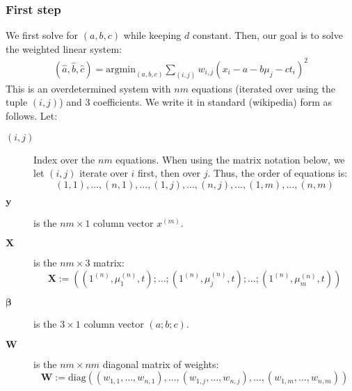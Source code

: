 \documentclass{article}
\begin{document}
\subsubsection{First step}

We first solve for $(a,b,c)$ while keeping $d$ constant. Then, our goal is to solve the weighted linear system:
\begin{align*}
(\hat{a}, \hat{b}, \hat{c}) = \mathrm{argmin}_{(a,b,c)} \sum_{(i,j)} w_{i,j} \left( x_i - a - b \mu_j - c t_i \right)^2
\end{align*}
This is an overdetermined system with $nm$ equations (iterated over using the tuple $(i,j)$) and 3 coefficients. We write it in standard (wikipedia) form as follows. Let:
\begin{description}
\item[$(i,j)$] Index over the $nm$ equations. When using the matrix notation below, we let $(i,j)$ iterate over $i$ first, then over $j$. Thus, the order of equations is:
\[
(1,1), \dots, (n,1), \dots, (1,j), \dots, (n,j), \dots, (1,m), \dots, (n,m)
\]

\item[$\bm{y}$] is the $nm \times 1$ column vector $x^{(m)}$.

\item[$\bm{X}$] is the $nm \times 3$ matrix:
\[
\bm{X} := \left( (1^{(n)}, \mu_1^{(n)}, t); \dots ; (1^{(n)}, \mu_j^{(n)}, t) ; \dots ; (1^{(n)}, \mu_m^{(n)}, t) \right)
\]

\item[$\bm{\beta}$] is the $3 \times 1$ column vector $(a;b;c)$.

\item[$\bm{W}$] is the $nm \times nm$ diagonal matrix of weights:
\[
\bm{W} := \mathrm{diag} \left( (w_{1,1}, \dots, w_{n,1}), \dots, (w_{1,j}, \dots, w_{n,j}), \dots, (w_{1,m}, \dots, w_{n,m}) \right)
\]
\end{description}
\end{document}
